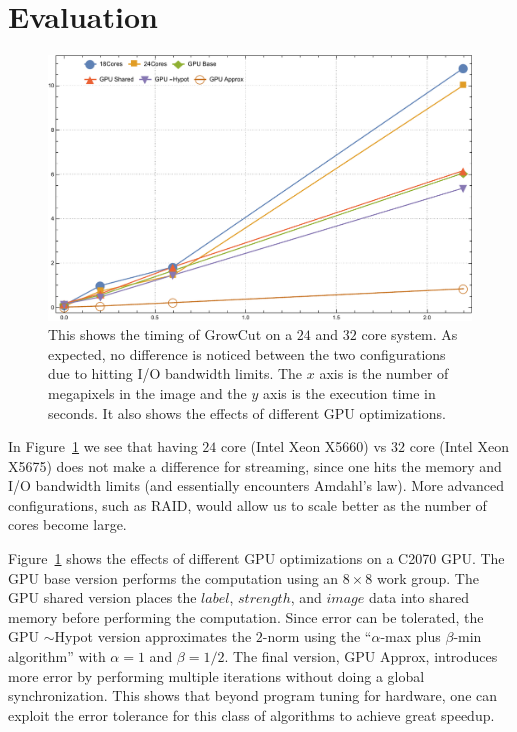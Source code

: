 \documentclass[
10pt, %
letterpaper, %
oneside, %
headinclude,footinclude, %
BCOR5mm, %
]{scrartcl}
\begin{document}

\section{Evaluation}


\begin{figure}[tb]
\centering 
\includegraphics[width=\columnwidth]{figs/perf.pdf} 
\caption{This shows the timing of GrowCut on a $24$ and $32$ core system.
As expected, no difference is noticed between the two configurations due to hitting I/O
bandwidth limits. The $x$ axis is the number of megapixels in the image and the $y$ axis is the execution time in seconds. It also shows the effects of different GPU optimizations.}
\label{fig:growcut} 
\end{figure}

In Figure~\ref{fig:growcut} we see that having $24$ core (Intel Xeon X5660) vs $32$ core (Intel Xeon X5675) does not make a difference for streaming, since
  one hits the memory and I/O bandwidth limits (and essentially encounters Amdahl's law).
More advanced configurations, such as RAID, would allow us to scale better as the number of cores become large.

Figure~\ref{fig:growcut} shows the effects of different GPU optimizations on a C2070 GPU.
The GPU base version performs the computation using an $8 \times 8$ work group.
The GPU shared version places the $label$, $strength$, and $image$ data into 
  shared memory before performing the computation.
Since error can be tolerated, the GPU $\sim$Hypot version approximates
  the $2$-norm using the  ``$\alpha$-max plus $\beta$-min algorithm'' with
  $\alpha = 1$ and $\beta = 1/2$.
The final version, GPU Approx, introduces more error by performing multiple iterations without doing a global synchronization.
This shows that beyond program tuning for hardware, one can exploit the error tolerance for this class of algorithms to achieve great speedup.
\end{document}
